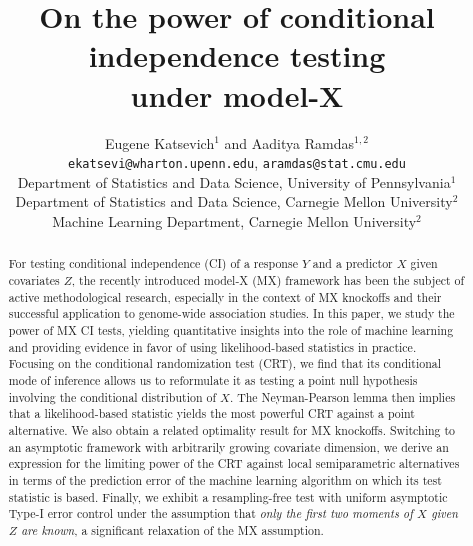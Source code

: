 \documentclass[12pt]{article}
\theoremstyle{definition}
\theoremstyle{remark}
\begin{document}
\title{On the power of conditional independence testing \\ under model-X}
\author{Eugene Katsevich$^1$ and Aaditya Ramdas$^{1,2}$\\
	[10pt]
	\texttt{ekatsevi@wharton.upenn.edu},
	\texttt{aramdas@stat.cmu.edu} \\
	Department of Statistics and Data Science, University of Pennsylvania$^1$\\
	Department of Statistics and Data Science, 	Carnegie Mellon University$^2$\\
	Machine Learning Department, Carnegie Mellon University$^2$
}


\maketitle
\thispagestyle{empty}

	
\begin{abstract}
For testing conditional independence (CI) of a response $Y$ and a predictor $X$ given covariates $Z$, the recently introduced model-X (MX) framework has been the subject of active methodological research, especially in the context of MX knockoffs and their successful application to genome-wide association studies. In this paper, we study the power of MX CI tests, yielding quantitative insights into the role of machine learning and providing evidence in favor of using likelihood-based statistics in practice. Focusing on the conditional randomization test (CRT), we find that its conditional mode of inference allows us to reformulate it as testing a point null hypothesis involving the conditional distribution of $X$. The Neyman-Pearson lemma then implies that a likelihood-based statistic yields the most powerful CRT against a point alternative. We also obtain a related optimality result for MX knockoffs. Switching to an asymptotic framework with arbitrarily growing covariate dimension, we derive an expression for the limiting power of the CRT against local semiparametric alternatives in terms of the prediction error of the machine learning algorithm on which its test statistic is based. Finally, we exhibit a resampling-free test with uniform asymptotic Type-I error control under the assumption that \textit{only the first two moments of $X$ given $Z$ are known}, a significant relaxation of the MX assumption. 
\end{abstract}
	
\end{document}
